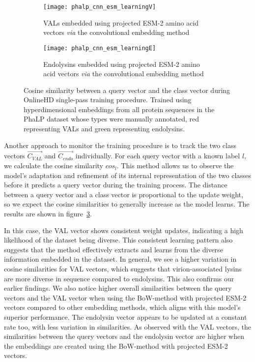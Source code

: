 \begin{figure}[htbp]
    \begin{subfigure}{0.48\textwidth}
        \texttt{[image: phalp\_cnn\_esm\_learningV]}
        \caption{VALs embedded using projected ESM-2 amino acid vectors \textit{via} the convolutional embedding method}
        \label{fig:subfig-g}
    \end{subfigure}
    \hfill
    \begin{subfigure}{0.48\textwidth}
        \texttt{[image: phalp\_cnn\_esm\_learningE]}
        \caption{Endolysins embedded using projected ESM-2 amino acid vectors \textit{via} the convolutional embedding method}
        \label{fig:subfig-h}
    \end{subfigure}
    
    \caption{Cosine similarity between a query vector and the class vector during OnlineHD single-pass training procedure. Trained using hyperdimensional embeddings from all protein sequences in the PhaLP dataset whose types were manually annotated, red representing VALs and green representing endolysins.}
    \label{fig:main}
\end{figure}

Another approach to monitor the training procedure is to track the two class vectors $\vec{C_{VAL}}$ and $\vec{C_{endo}}$ individually. For each query vector with a known label $l$, we calculate the cosine similarity $cos_{l}$. This method allows us to observe the model's adaptation and refinement of its internal representation of the two classes before it predicts a query vector during the training process. The distance between a query vector and a class vector is proportional to the update weight, so we expect the cosine similarities to generally increase as the model learns. The results are shown in figure~\ref{fig:main}.

In this case, the VAL vector shows consistent weight updates, indicating a high likelihood of the dataset being diverse. This consistent learning pattern also suggests that the method effectively extracts and learns from the diverse information embedded in the dataset. In general, we see a higher variation in cosine similarities for VAL vectors, which suggests that virion-associated lysins are more diverse in sequence compared to endolysins. This also confirms our earlier findings. We also notice higher overall similarities between the query vectors and the VAL vector when using the BoW-method with projected ESM-2 vectors compared to other embedding methods, which aligns with this model's superior performance. The endolysin vector appears to be updated at a constant rate too, with less variation in similarities. As observed with the VAL vectors, the similarities between the query vectors and the endolysin vector are higher when the embeddings are created using the BoW-method with projected ESM-2 vectors.

